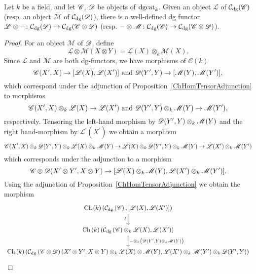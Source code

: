 \documentclass[dissertation.tex]{subfiles}
\begin{document}
        \begin{lem}
          Let $k$ be a field, and let $\mathscr{C}$, $\mathscr{D}$ be objects of $\operatorname{dgcat}_k$.
          Given an object $\mathscr{L}$ of $\mathcal{C}_\text{dg}(\mathscr{C})$ (resp. an object $\mathscr{M}$ of $\mathcal{C}_\text{dg}(\mathscr{D})$), there is a well-defined dg functor $\mathscr{L} \otimes - \colon \mathcal{C}_\text{dg}(\mathscr{D}) \to \mathcal{C}_\text{dg}(\mathscr{C} \otimes \mathscr{D})$ (resp. $- \otimes \mathscr{M} \colon \mathcal{C}_\text{dg}(\mathscr{C}) \to \mathcal{C}_\text{dg}(\mathscr{C} \otimes \mathscr{D})$).
          

          \begin{proof}
            For an object $\mathscr{M}$ of $\D$, define 
            $$\mathscr{L} \otimes \mathscr{M}(X \otimes Y) = \mathscr{L}(X) \otimes_k \mathscr{M}(X).$$
            Since $\mathscr{L}$ and $\mathscr{M}$ are both dg-functors, we have morphisms of $\mathcal{C}(k)$
            $$\CC(X^\prime, X) \to [\mathscr{L}(X), \mathscr{L}(X^\prime)]\ \text{and}\ \D(Y^\prime, Y) \to [\mathscr{M}(Y), \mathscr{M}(Y^\prime)],$$
            which correspond under the adjunction of Proposition~\ref{ChHomTensorAdjunction} to morphisms
            $$\CC(X^\prime, X) \otimes_k \mathscr{L}(X) \to \mathscr{L}(X^\prime)
            \ \text{and}\ 
            \D(Y^\prime, Y) \otimes_k \mathscr{M}(Y) \to \mathscr{M}(Y^\prime),$$
            respectively.
            Tensoring the left-hand morphism by $\D(Y^\prime,Y) \otimes_k \mathscr{M}(Y)$ and the right hand-morphism by $\mathscr{L^\prime}(X^\prime)$ we obtain a morphism
            $$\CC(X^\prime, X) \otimes_k \D(Y^\prime, Y) \otimes_k \mathscr{L}(X) \otimes_k \mathscr{M}(Y) \to 
            \mathscr{L}(X) \otimes_k \D(Y^\prime,Y) \otimes_k \mathscr{M}(Y) \to
            \mathscr{L}(X^\prime) \otimes_k \mathscr{M}(Y^\prime)$$
            which corresponds under the adjunction to a morphism
            $$\CC \otimes \D(X^\prime \otimes Y^\prime, X \otimes Y) \to
            [\mathscr{L}(X) \otimes_k \mathscr{M}(Y), \mathscr{L}(X^\prime) \otimes_k \mathscr{M}(Y^\prime)].$$
            Using the adjunction of Proposition~\ref{ChHomTensorAdjunction} we obtain the morphism
            $$\begin{tikzcd}
              \Ch{k}(\cdg{\CC}, [\funct{L}(X), \funct{L}(X^\prime)]) \arrow{d}[rotate=90,xshift=-1ex,yshift=1ex]{\sim}\\
              \Ch{k}(\cdg{\CC} \otimes_k \funct{L}(X), \funct{L}(X^\prime))\arrow{d}{- \otimes_k \left(\D(Y^\prime, Y) \otimes_k \funct{M}(Y)\right)}\\
              \Ch{k}(\cdg{\CC \otimes \D}(X^\prime \otimes Y^\prime, X \otimes Y) \otimes_k \funct{L}(X) \otimes \funct{M}(Y), \funct{L}(X^\prime) \otimes_k \funct{M}(Y^\prime) \otimes_k \D(Y^\prime, Y))

\end{tikzcd}$$
\end{proof}
\end{lem}
\end{document}
